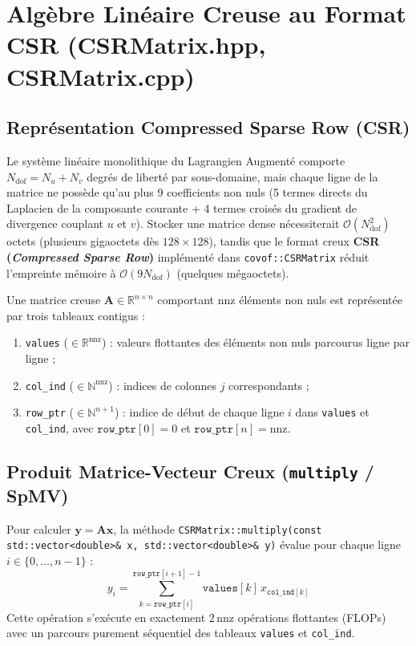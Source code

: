 \documentclass[10pt,a4paper,oneside]{book}
\begin{document}
\chapter{Algèbre Linéaire Creuse au Format CSR (CSRMatrix.hpp, CSRMatrix.cpp)}
\section{Représentation Compressed Sparse Row (CSR)}
Le système linéaire monolithique du Lagrangien Augmenté comporte $N_{\text{dof}} = N_u + N_v$ degrés de liberté par sous-domaine, mais chaque ligne de la matrice ne possède qu'au plus 9 coefficients non nuls (5 termes directs du Laplacien de la composante courante + 4 termes croisés du gradient de divergence couplant $u$ et $v$). Stocker une matrice dense nécessiterait $\mathcal{O}(N_{\text{dof}}^2)$ octets (plusieurs gigaoctets dès $128\times 128$), tandis que le format creux \textbf{CSR (\emph{Compressed Sparse Row})} implémenté dans \texttt{covof::CSRMatrix} réduit l'empreinte mémoire à $\mathcal{O}(9 N_{\text{dof}})$ (quelques mégaoctets).

Une matrice creuse $\mathbf{A} \in \mathbb{R}^{n \times n}$ comportant $\text{nnz}$ éléments non nuls est représentée par trois tableaux contigus :
\begin{enumerate}
  \item \texttt{values} ($\in \mathbb{R}^{\text{nnz}}$) : valeurs flottantes des éléments non nuls parcourus ligne par ligne ;
  \item \texttt{col\_ind} ($\in \mathbb{N}^{\text{nnz}}$) : indices de colonnes $j$ correspondants ;
  \item \texttt{row\_ptr} ($\in \mathbb{N}^{n+1}$) : indice de début de chaque ligne $i$ dans \texttt{values} et \texttt{col\_ind}, avec $\texttt{row\_ptr}[0] = 0$ et $\texttt{row\_ptr}[n] = \text{nnz}$.
\end{enumerate}

\section{Produit Matrice-Vecteur Creux (\texttt{multiply} / SpMV)}
Pour calculer $\mathbf{y} = \mathbf{A}\mathbf{x}$, la méthode \texttt{CSRMatrix::multiply(const std::vector<double>\& x, std::vector<double>\& y)} évalue pour chaque ligne $i \in \{0, \dots, n-1\}$ :
\begin{equation}
  y_i = \sum_{k = \texttt{row\_ptr}[i]}^{\texttt{row\_ptr}[i+1]-1} \texttt{values}[k] \, x_{\texttt{col\_ind}[k]}
\end{equation}
Cette opération s'exécute en exactement $2\,\text{nnz}$ opérations flottantes (FLOPs) avec un parcours purement séquentiel des tableaux \texttt{values} et \texttt{col\_ind}.
\end{document}

